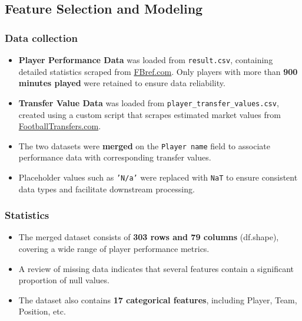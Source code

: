 \documentclass[12pt,a4paper]{report}
\begin{document}
\subsection{Feature Selection and Modeling}
\subsubsection{Data collection}
\begin{itemize}
    \item \textbf{Player Performance Data} was loaded from \texttt{result.csv}, containing detailed statistics scraped from \href{https://fbref.com/en/}{FBref.com}. Only players with more than \textbf{900 minutes played} were retained to ensure data reliability.
    \item \textbf{Transfer Value Data} was loaded from \texttt{player\_transfer\_values.csv}, created using a custom script that scrapes estimated market values from \href{https://footballtransfers.com}{FootballTransfers.com}.
    \item The two datasets were \textbf{merged} on the \texttt{Player name} field to associate performance data with corresponding transfer values.
    \item Placeholder values such as \texttt{'N/a'} were replaced with \texttt{NaT} to ensure consistent data types and facilitate downstream processing.
\end{itemize}

\subsubsection{Statistics}
\begin{itemize}
    \item The merged dataset consists of \textbf{303 rows and 79 columns} (df.shape), covering a wide range of player performance metrics.
    \item A review of missing data indicates that several features contain a significant proportion of null values.
    \item The dataset also contains \textbf{17 categorical features}, including Player, Team, Position, etc.
\end{itemize}
\end{document}
